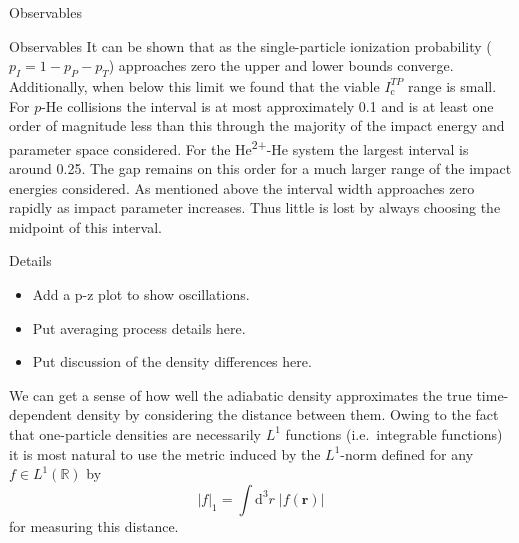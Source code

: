 \documentclass[letterpaper, 11 pt]{report}
\begin{document}
\begin{chapter}{Observables \label{chap:p-he2p-he}}
\begin{section}{Observables \label{sec:phe2p-obs}}
      It can be shown that as the single-particle ionization probability ($p_I = 1 - p_P - p_T$)
      approaches zero the upper and lower bounds converge. Additionally, when below this limit we found
      that the viable $I_\mathrm{c}^{TP}$ range is small. For $p$-He collisions the interval is at most
      approximately 0.1 and is at least one order of magnitude less than this through the majority of the
      impact energy and parameter space considered. For the He\textsuperscript{2+}-He system the largest
      interval is around 0.25. The gap remains on this order for a much larger range of the impact
      energies considered. As mentioned above the interval width approaches zero rapidly as impact
      parameter increases. Thus little is lost by always choosing the midpoint of this interval.

   \end{section}

   \begin{section}{Details \label{sec:phe2p-det}}

      \begin{itemize}

         \item Add a p-z plot to show oscillations.

         \item Put averaging process details here.

         \item Put discussion of the density differences here.

      \end{itemize}

      We can get a sense of how well the adiabatic density approximates the true time-dependent density
      by considering the distance between them. Owing to the fact that one-particle densities are 
      necessarily $L^1$ functions (i.e.\ integrable functions) it is most natural to use the metric
      induced by the $L^1$-norm defined for any $f \in L^1\left(\mathbb{R}\right)$ by
      \begin{equation} \label{eq:l1rorm}
         \left| f \right|_1 = \int \mathrm{d}^3 r \; \left| f(\mathbf{r}) \right|
      \end{equation}
      for measuring this distance.
      

\end{section}
\end{chapter}
\end{document}

